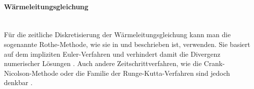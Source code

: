 \documentclass[crop=false]{standalone}
\begin{document}
        \paragraph{Wärmeleitungsgleichung} %
        \label{par:heat-equation}
        \hfill\\
          Für die zeitliche Diskretisierung der Wärmeleitungsgleichung kann man die sogenannte Rothe-Methode, wie sie in \cite[S.~211~ff]{Schweizer2013} und \cite{Alberty1998} beschrieben ist, verwenden.
          Sie basiert auf dem impliziten Euler-Verfahren und verhindert damit die Divergenz numerischer Lösungen \cite[S.~472~f]{Quarteroni2000}.
          Auch andere Zeitschrittverfahren, wie die Crank-Nicolson-Methode oder die Familie der Runge-Kutta-Verfahren sind jedoch denkbar \cite{Quarteroni2000,Cheney2008}.
\end{document}
